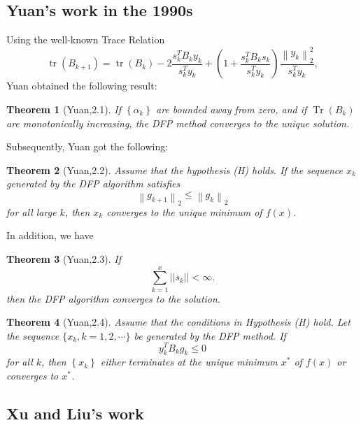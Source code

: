 \documentclass[12pt,a4paper,draft]{article}  %
\newtheorem{theorem}{Theorem}[section]
\theoremstyle{definition}
\numberwithin{equation}{section}
\begin{document}
\subsection{Yuan's work in the 1990s}
 Using the well-known Trace Relation\begin{equation}
    \operatorname{tr}\left(B_{k+1}\right)=\operatorname{tr}\left(B_{k}\right)-2 \frac{s_{k}^{T} B_{k} y_{k}}{s_{k}^{T} y_{k}}+\left(1+\frac{s_{k}^{T} B_{k} s_{k}}{s_{k}^{T} y_{k}}\right) \frac{\left\|y_{k}\right\|_{2}^{2}}{s_{k}^{T} y_{k}},  \tag{1.20}
    \end{equation}
    Yuan obtained the following result:
    \begin{theorem}[Yuan,2.1]
        If $\left\{\alpha_{k}\right\}$ are bounded away from zero, and if $\operatorname{Tr}\left(B_{k}\right)$ are monotonically increasing, the DFP method converges to the unique solution.
    \end{theorem}
Subsequently, Yuan got the following:
    \begin{theorem}[Yuan,2.2]
       Assume that the hypothesis (H) holds. If the sequence $x_{k}$ generated by the DFP algorithm satisfies
\begin{equation*}
\left\|g_{k+1}\right\|_{2} \leqslant\left\|g_{k}\right\|_{2} \tag{2.21}
\end{equation*}
for all large $k$, then $x_{k}$ converges to the unique minimum of $f(x)$.
    \end{theorem}
In addition, we have
        \begin{theorem}[Yuan,2.3]
If
\begin{equation*}
\sum_{k=1}^{x}| | s_{k}| |<\infty . \tag{2.43}
\end{equation*}
then the DFP algorithm converges to the solution.
    \end{theorem}
    \begin{theorem}[Yuan,2.4]
        Assume that the conditions in Hypothesis (H) hold. Let the sequence $\{x_{k}, k=1,2, \cdots\}$ be generated by the DFP method. If
\begin{equation*}
y_{k}^{T} B_{k} g_{k} \leqslant 0 \tag{2.47}
\end{equation*}
for all $k$, then $\left\{x_{k}\right\}$ either terminates at the unique minimum $x^{*}$ of $f(x)$ or converges to $x^{*}$.
    \end{theorem}



\subsection{Xu and Liu's work}
\end{document}
